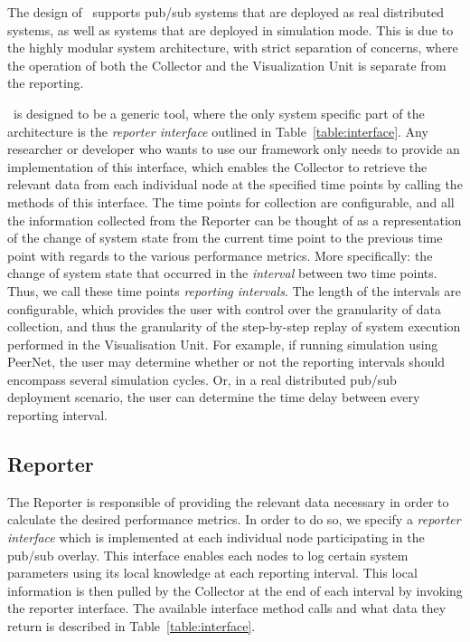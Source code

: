 The design of \demo~supports pub/sub systems that are deployed as
real distributed systems, as well as systems that are deployed in
simulation mode. This is due to the highly modular system architecture,
with strict separation of concerns, where the operation of both the
Collector and the Visualization Unit is separate from the reporting.

\demo~is designed to be a generic tool, where the only system specific
part of the architecture is the \emph{reporter interface} outlined in
Table~\ref{table:interface}. Any researcher or developer who wants to
use our framework only needs to provide an implementation of this
interface, which enables the Collector to retrieve the relevant data
from each individual node at the specified time points by calling the
methods of this interface. The time points for collection are
configurable, and all the information collected from the Reporter can be
thought of as a representation of the change of system state from the
current time point to the previous time point with regards to the various performance metrics. More
specifically: the change of system state that occurred in the
\emph{interval} between two time points. Thus, we call these time points
\emph{reporting intervals}. The length of the intervals are configurable,
which provides the user with control over the granularity of data
collection, and thus the granularity of the step-by-step replay of
system execution performed in the Visualisation Unit. For example, if
running simulation using PeerNet, the user may determine whether or not
the reporting intervals should encompass several simulation cycles. Or,
in a real distributed pub/sub deployment scenario, the user can
determine the time delay between every reporting interval.


\subsection{Reporter}

The Reporter is responsible of providing the relevant data necessary in
order to calculate the desired performance metrics. In order to do so,
we specify a \emph{reporter interface} which is implemented at each
individual node participating in the pub/sub overlay. This interface
enables each nodes to log certain system parameters using its local
knowledge at each reporting interval. This local information is then pulled
by the Collector at the end of each interval by invoking the
reporter interface. The available interface method calls and what data
they return is described in Table~\ref{table:interface}.

